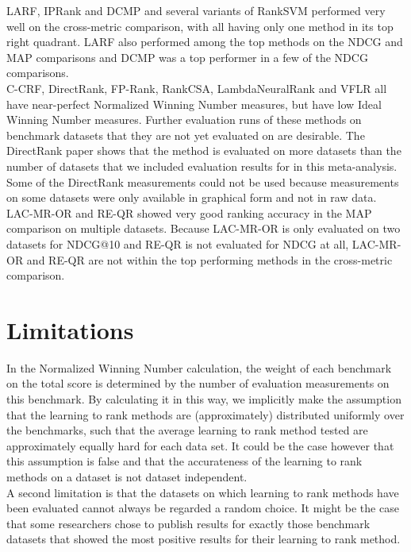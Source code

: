 \documentclass{sig-alternate}
\begin{document}
LARF, IPRank and DCMP and several variants of RankSVM performed very well on the cross-metric comparison, with all having only one method in its top right quadrant. LARF also performed among the top methods on the NDCG and MAP comparisons and DCMP was a top performer in a few of the NDCG comparisons.\\

C-CRF, DirectRank, FP-Rank, RankCSA, LambdaNeuralRank and VFLR all have near-perfect Normalized Winning Number measures, but have low Ideal Winning Number measures. Further evaluation runs of these methods on benchmark datasets that they are not yet evaluated on are desirable. The DirectRank paper \cite{Tan2013} shows that the method  is evaluated on more datasets than the number of datasets that we included evaluation results for in this meta-analysis. Some of the DirectRank measurements could not be used because measurements on some datasets were only available in graphical form and not in raw data.\\

LAC-MR-OR and RE-QR showed very good ranking accuracy in the MAP comparison on multiple datasets. Because LAC-MR-OR is only evaluated on two datasets for NDCG@10 and RE-QR is not evaluated for NDCG at all, LAC-MR-OR and RE-QR are not within the top performing methods in the cross-metric comparison. 

\section{Limitations}
In the Normalized Winning Number calculation, the weight of each benchmark on the total score is determined by the number of evaluation measurements on this benchmark. By calculating it in this way, we implicitly make the assumption that the learning to rank methods are (approximately) distributed uniformly over the benchmarks, such that the average learning to rank method tested are approximately equally hard for each data set. It could be the case however that this assumption is false and that the accurateness of the learning to rank methods on a dataset is not dataset independent.\\

A second limitation is that the datasets on which learning to rank methods have been evaluated cannot always be regarded a random choice. It might be the case that some researchers chose to publish results for exactly those benchmark datasets that showed the most positive results for their learning to rank method.\\
\end{document}

